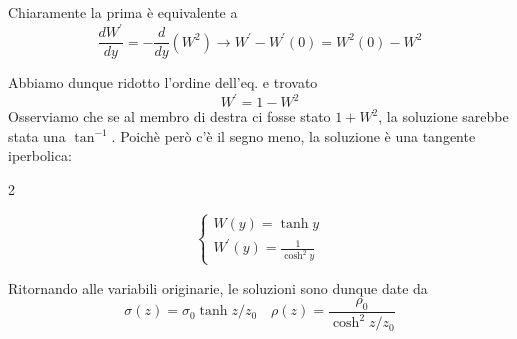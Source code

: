 \documentclass{report}
\begin{document}
{    Chiaramente la prima è equivalente a 
    \begin{equation}
        \frac{dW^{'}}{dy} = -\frac{d}{dy}(W^2) \rightarrow W^{'} - W^{'}(0) = W^2(0) - W^2
    \end{equation}

    Abbiamo dunque ridotto l'ordine dell'eq. e trovato 
    \begin{equation}
        W^{'} = 1 -W^2
    \end{equation}
    Osserviamo che se al membro di destra ci fosse stato $1 + W^2$, la soluzione sarebbe stata una $\tan^{-1}$. Poichè però c'è il segno meno, la soluzione è una tangente iperbolica: 

    \vspace{1cm}

    \begin{multicols}{2}
    
    \[\begin{cases}
        W(y) = \tanh{y} \\
        W^{'}(y) = \frac{1}{\cosh^2{y}}
    \end{cases}\]

    Ritornando alle variabili originarie, le soluzioni sono dunque date da 
    \begin{equation}
        \sigma(z) = \sigma_0 \tanh{z/z_0} \quad \rho(z) = \frac{\rho_0}{\cosh^2{z/z_0}}
    \end{equation}

    \columnbreak
    
    
    \end{multicols}
    
}
\end{document}
